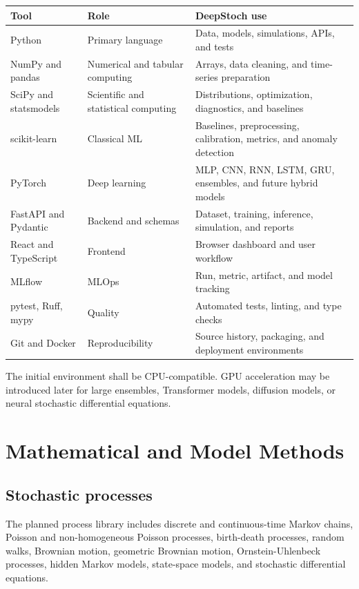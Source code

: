 \documentclass[11pt,a4paper]{report}
\begin{document}
\begin{tabularx}{\textwidth}{p{3cm}p{4cm}Y}
\toprule Tool & Role & DeepStoch use \\
\midrule
Python & Primary language & Data, models, simulations, APIs, and tests \\
NumPy and pandas & Numerical and tabular computing & Arrays, data cleaning, and time-series preparation \\
SciPy and statsmodels & Scientific and statistical computing & Distributions, optimization, diagnostics, and baselines \\
scikit-learn & Classical ML & Baselines, preprocessing, calibration, metrics, and anomaly detection \\
PyTorch & Deep learning & MLP, CNN, RNN, LSTM, GRU, ensembles, and future hybrid models \\
FastAPI and Pydantic & Backend and schemas & Dataset, training, inference, simulation, and reports \\
React and TypeScript & Frontend & Browser dashboard and user workflow \\
MLflow & MLOps & Run, metric, artifact, and model tracking \\
pytest, Ruff, mypy & Quality & Automated tests, linting, and type checks \\
Git and Docker & Reproducibility & Source history, packaging, and deployment environments \\
\bottomrule
\end{tabularx}

The initial environment shall be CPU-compatible. GPU acceleration may be introduced later for large ensembles, Transformer models, diffusion models, or neural stochastic differential equations.

\chapter{Mathematical and Model Methods}

\section{Stochastic processes}

The planned process library includes discrete and continuous-time Markov chains, Poisson and non-homogeneous Poisson processes, birth-death processes, random walks, Brownian motion, geometric Brownian motion, Ornstein-Uhlenbeck processes, hidden Markov models, state-space models, and stochastic differential equations.
\end{document}
